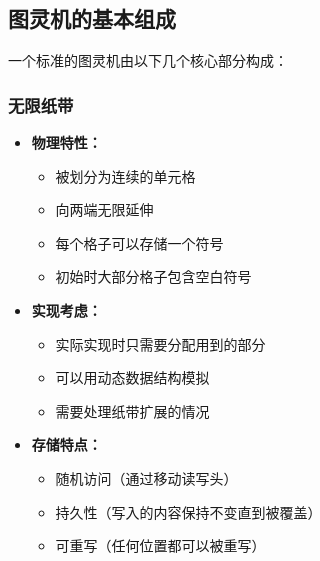\documentclass[a4paper,12pt]{ctexart}
\begin{document}
\subsection{图灵机的基本组成}
一个标准的图灵机由以下几个核心部分构成：

\subsubsection{无限纸带}
\begin{itemize}
    \item \textbf{物理特性：}
        \begin{itemize}
            \item 被划分为连续的单元格
            \item 向两端无限延伸
            \item 每个格子可以存储一个符号
            \item 初始时大部分格子包含空白符号
        \end{itemize}
    \item \textbf{实现考虑：}
        \begin{itemize}
            \item 实际实现时只需要分配用到的部分
            \item 可以用动态数据结构模拟
            \item 需要处理纸带扩展的情况
        \end{itemize}
    \item \textbf{存储特点：}
        \begin{itemize}
            \item 随机访问（通过移动读写头）
            \item 持久性（写入的内容保持不变直到被覆盖）
            \item 可重写（任何位置都可以被重写）
        \end{itemize}
\end{itemize}
\end{document}
